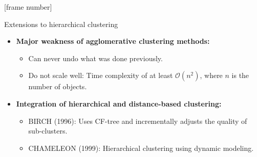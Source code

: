 \documentclass[aspectratio=169,t,xcolor=dvipsnames]{beamer}
\begin{document}
  { %
    [frame number]
    \begin{frame}{Extensions to hierarchical clustering}
      \begin{itemize}
        \item \textbf{Major weakness of agglomerative clustering methods:}
        \begin{itemize}
          \item Can never undo what was done previously.
          \item Do not scale well: Time complexity of at least $\mathcal{O}(n^2)$, where $n$ is the number of objects.
        \end{itemize}
        \item \textbf{Integration of hierarchical and distance-based clustering:}
        \begin{itemize}
          \item BIRCH (1996): Uses CF-tree and incrementally adjusts the quality of sub-clusters.
          \item CHAMELEON (1999): Hierarchical clustering using dynamic modeling.
        \end{itemize}
      \end{itemize}
    \end{frame}
  }
\end{document}
